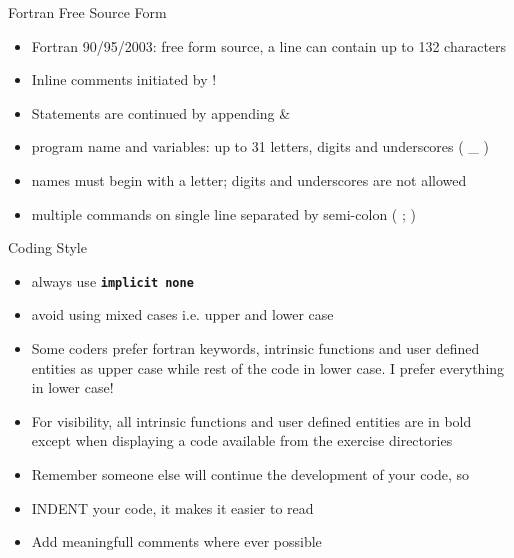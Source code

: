 \documentclass[slidestop,mathserif,compress,xcolor=svgnames]{beamer}
\newenvironment{ablock}[0]
{
\begin{beamerboxesrounded}[upper=uppercol,lower=lowercol,shadow=true]}
{\end{beamerboxesrounded}}
\begin{document}
\begin{frame}[allowframebreaks]
  \begin{block}{\scriptsize Fortran Free Source Form}
    \begin{itemize}
      \item Fortran 90/95/2003: free form source, a line can contain up to 132 characters
      \item Inline comments initiated by !
      \item Statements are continued by appending \& 
      \item program name and variables: up to 31 letters, digits and underscores ( \_ )
      \item {\color{red}names must begin with a letter}; digits and underscores are not allowed
      \item multiple commands on single line separated by semi-colon ( ; )
    \end{itemize}
  \end{block}

  \begin{ablock}{Coding Style}
    \begin{itemize}
      \item always use \textbf{\texttt{implicit none}}
      \item avoid using mixed cases i.e. upper and lower case
      \item[] Some coders prefer fortran keywords, intrinsic functions and user defined entities as upper case while rest of the code in lower case. I prefer everything in lower case!
      \item[] For visibility, all intrinsic functions and user defined entities are in bold except when displaying a code available from the exercise directories
      \item Remember someone else will continue the development of your code, so
      \item[] INDENT your code, it makes it easier to read
      \item[] Add meaningfull comments where ever possible
    \end{itemize}
  \end{ablock}


\end{frame}
\end{document}
